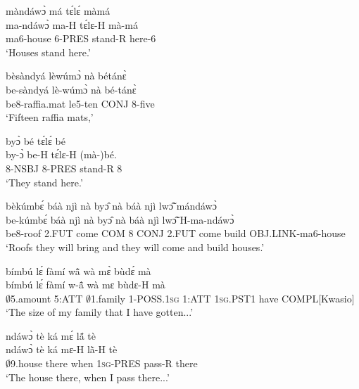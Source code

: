 \begin{exe} 
\exC\label{54} 
  \glll  màndáwɔ̀ má tɛ́lɛ́ màmá \\
         ma-ndáwɔ̀ ma-H tɛ́lɛ-H mà-má \\
           ma6-house 6-PRES stand-R here-6  \\
    \trans `Houses stand here.'
\end{exe}

\begin{exe} 
\exC\label{55}
  \glll   bèsàndyá lèwúmɔ̀ nà bétánɛ̀ \\
           be-sàndyá lè-wúmɔ̀ nà bé-tánɛ̀ \\
           be8-raffia.mat le5-ten CONJ 8-five  \\
    \trans `Fifteen raffia mats,'
\end{exe}

\begin{exe} 
\exC\label{56}
  \glll   byɔ̀ bé tɛ́lɛ́ bé \\
         by-ɔ̀ be-H tɛ́lɛ-H (mà-)bé. \\
           8-NSBJ  8-PRES stand-R 8 \\
    \trans `They stand here.'
\end{exe}

\begin{exe} 
\exC\label{57} 
  \glll   bèkúmbɛ́ báà njì nà byɔ̂ nà báà njì lwɔ̃̂ mándáwɔ̀\\
          be-kúmbɛ́ báà njì nà byɔ̂ nà báà njì lwɔ̃̂ H-ma-ndáwɔ̀\\
           be8-roof  2.FUT come COM 8 CONJ 2.FUT come build OBJ.LINK-ma6-house\\
    \trans `Roofs they will bring and they will come and build houses.'
\end{exe}

\begin{exe} 
\exC\label{58} 
  \glll   bímbú lɛ́ fàmí wã̂ wà mɛ̀ bùdɛ́ mà\\
           bímbú lɛ́ fàmí w-ã̂ wà mɛ bùdɛ-H mà\\
           $\emptyset$5.amount 5:ATT $\emptyset$1.family 1-POSS.1\textsc{sg} 1:ATT 1\textsc{sg}.PST1 have COMPL[Kwasio]\\
    \trans `The size of my family that I have gotten...'
\end{exe}

\begin{exe} 
\exC\label{59}
  \glll  ndáwɔ̀ tè ká mɛ́ lã́ tè  \\
         ndáwɔ̀ tè ká mɛ-H lã̀-H tè  \\
           $\emptyset$9.house there when 1\textsc{sg}-PRES pass-R there  \\
    \trans `The house there, when I pass there...'
\end{exe}

